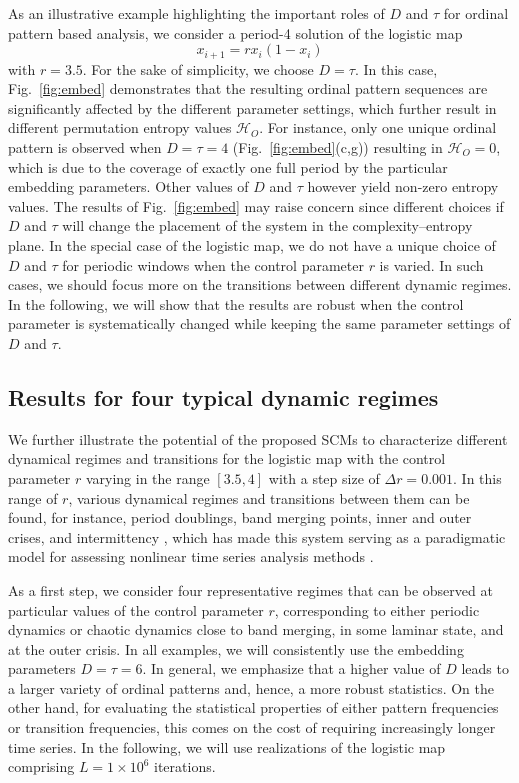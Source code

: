 \documentclass[12pt,aip,cha,reprint,nofootinbib]{revtex4-1}
\begin{document}
As an illustrative example highlighting the important roles of $D$ and $\tau$ for ordinal pattern based analysis, we consider a period-4 solution of the logistic map 
\begin{equation}
x_{i+1}=rx_i(1-x_i) 
\end{equation}
\noindent
with $r= 3.5$. For the sake of simplicity, we choose $D = \tau $. In this case, Fig.~\ref{fig:embed} demonstrates that the resulting ordinal pattern sequences are significantly affected by the different parameter settings, which further result in different permutation entropy values $\mathcal{H}_O$. For instance, only one unique ordinal pattern is observed when $D = \tau = 4$ (Fig.~\ref{fig:embed}(c,g)) resulting in $\mathcal{H}_O = 0$, which is due to the coverage of exactly one full period by the particular embedding parameters. Other values of $D$ and $\tau$ however yield non-zero entropy values. The results of Fig.~\ref{fig:embed} may raise concern since different choices if $D$ and $\tau$ will change the placement of the system in the complexity--entropy plane. In the special case of the logistic map, we do not have a unique choice of $D$ and $\tau$ for periodic windows when the control parameter $r$ is varied. In such cases, we should focus more on the transitions between different dynamic regimes. In the following, we will show that the results are robust when the control parameter is systematically changed while keeping the same parameter settings of $D$ and $\tau$.

\subsection{Results for four typical dynamic regimes} \label{sec:four}

We further illustrate the potential of the proposed SCMs to characterize different dynamical regimes and transitions for the logistic map with the control parameter $r$ varying in the range $[3.5, 4]$ with a step size of $\Delta r = 0.001$. In this range of $r$, various dynamical regimes and transitions between them can be found, for instance, period doublings, band merging points, inner and outer crises, and intermittency \cite{Kantz97}, which has made this system serving as a paradigmatic model for assessing nonlinear time series analysis methods \cite{MarwanPLA2009}. 

As a first step, we consider four representative regimes that can be observed at particular values of the control parameter $r$, corresponding to either periodic dynamics or chaotic dynamics close to band merging, in some laminar state, and at the outer crisis. In all examples, we will consistently use the embedding parameters $D = \tau = 6$. In general, we emphasize that a higher value of $D$ leads to a larger variety of ordinal patterns and, hence, a more robust statistics. On the other hand, for evaluating the statistical properties of either pattern frequencies or transition frequencies, this comes on the cost of requiring increasingly longer time series. In the following, we will use realizations of the logistic map comprising $L = 1 \times 10^6$ iterations. 
\end{document}

